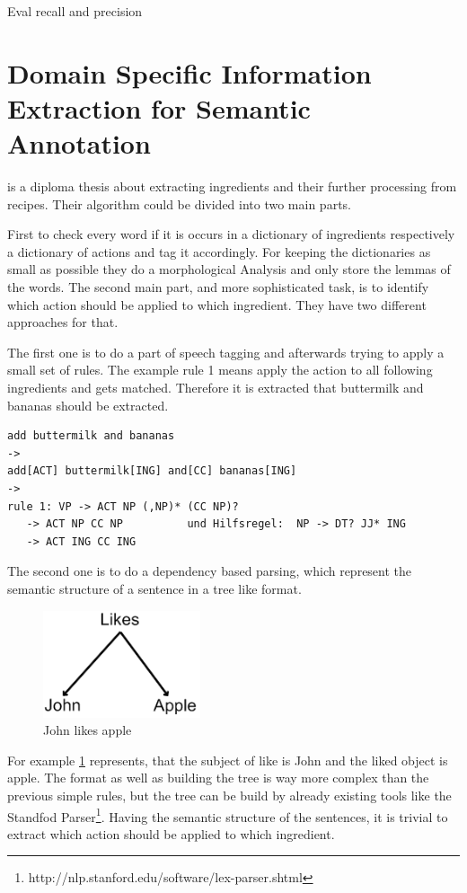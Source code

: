 \documentclass[12pt, twoside]{report}
\begin{document}
Eval recall and precision
 
\section{Domain Specific Information Extraction for Semantic Annotation}
\parencite{GrammaBased} is a diploma thesis about extracting ingredients and their further processing from recipes. Their algorithm could be divided into two main parts.

First to check every word if it is occurs in a dictionary of ingredients respectively a dictionary of actions and tag it accordingly. For keeping the dictionaries as small as possible they do a morphological Analysis and only store the lemmas of the words. The second main part, and more sophisticated task, is to identify which action should be applied to which ingredient. They have two different approaches for that.

The first one is to do a part of speech tagging and afterwards trying to apply a small set of rules. The example rule 1 means apply the action to all following ingredients and gets matched. Therefore it is extracted that buttermilk and bananas should be extracted.

\begin{lstlisting}[frame=single, basicstyle=\footnotesize\ttfamily,caption={Rule based example}, label=lst:ruleBased]
add buttermilk and bananas
->
add[ACT] buttermilk[ING] and[CC] bananas[ING]
->
rule 1: VP -> ACT NP (,NP)* (CC NP)?
   -> ACT NP CC NP			und Hilfsregel:  NP -> DT? JJ* ING
   -> ACT ING CC ING

\end{lstlisting}

The second one is to do a dependency based parsing, which represent the semantic structure of a sentence in a tree like format.

\begin{figure}[h]
	\centering
	\includegraphics[]{Images/JohnLikesApple}
	\caption{John likes apple \parencite{GrammaBased}}
	\label{fig:johnLikesApple}
\end{figure}

For example \cref{fig:johnLikesApple} represents, that the subject of like is John and the liked object is apple.
The format as well as building the tree is way more complex than the previous simple rules, but the tree can be build by already existing tools like the Standfod Parser\footnote{http://nlp.stanford.edu/software/lex-parser.shtml}. Having the semantic structure of the sentences, it is trivial to extract which action should be applied to which ingredient.
\end{document}
